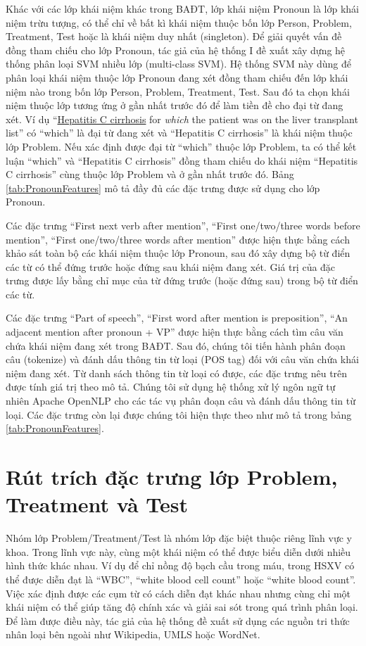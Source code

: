 Khác với các lớp khái niệm khác trong BAĐT, lớp khái niệm Pronoun là lớp khái niệm trừu tượng, có thể chỉ về bất kì khái niệm thuộc bốn lớp Person, Problem, Treatment, Test hoặc là khái niệm duy nhất (singleton). Để giải quyết vấn đề đồng tham chiếu cho lớp Pronoun, tác giả của hệ thống I đề xuất xây dựng hệ thống phân loại SVM nhiều lớp (multi-class SVM). Hệ thống SVM này dùng để phân loại khái niệm thuộc lớp Pronoun đang xét đồng tham chiếu đến lớp khái niệm nào trong bốn lớp Person, Problem, Treatment, Test. Sau đó ta chọn khái niệm thuộc lớp tương ứng ở gần nhất trước đó để làm tiền đề cho đại từ đang xét. Ví dụ ``\underline{Hepatitis C cirrhosis} for \textit{which} the patient was on the liver transplant list'' có ``which'' là đại từ đang xét và ``Hepatitis C cirrhosis'' là khái niệm thuộc lớp Problem. Nếu xác định được đại từ ``which'' thuộc lớp Problem, ta có thể kết luận ``which'' và ``Hepatitis C cirrhosis'' đồng tham chiếu do khái niệm ``Hepatitis C cirrhosis'' cùng thuộc lớp Problem và ở gần nhất trước đó. Bảng \ref{tab:PronounFeatures} mô tả đầy đủ các đặc trưng được sử dụng cho lớp Pronoun.

Các đặc trưng ``First next verb after mention'', ``First one/two/three words before mention'', ``First one/two/three words after mention'' được hiện thực bằng cách khảo sát toàn bộ các khái niệm thuộc lớp Pronoun, sau đó xây dựng bộ từ điển các từ có thể đứng trước hoặc đứng sau khái niệm đang xét. Giá trị của đặc trưng được lấy bằng chỉ mục của từ đứng trước (hoặc đứng sau) trong bộ từ điển các từ.

Các đặc trưng ``Part of speech'', ``First word after mention is preposition'', ``An adjacent mention after pronoun + VP'' được hiện thực bằng cách tìm câu văn chứa khái niệm đang xét trong BAĐT. Sau đó, chúng tôi tiến hành phân đoạn câu (tokenize) và đánh dấu thông tin từ loại (POS tag) đối với câu văn chứa khái niệm đang xét. Từ danh sách thông tin từ loại có được, các đặc trưng nêu trên được tính giá trị theo mô tả. Chúng tôi sử dụng hệ thống xử lý ngôn ngữ tự nhiên Apache OpenNLP cho các tác vụ phân đoạn câu và đánh dấu thông tin từ loại. Các đặc trưng còn lại được chúng tôi hiện thực theo như mô tả trong bảng \ref{tab:PronounFeatures}.

\section{Rút trích đặc trưng lớp Problem, Treatment và Test}
Nhóm lớp Problem/Treatment/Test là nhóm lớp đặc biệt thuộc riêng lĩnh vực y khoa. Trong lĩnh vực này, cùng một khái niệm có thể được biểu diễn dưới nhiều hình thức khác nhau. Ví dụ để chỉ nồng độ bạch cầu trong máu, trong HSXV có thể được diễn đạt là ``WBC'', ``white blood cell count'' hoặc ``white blood count''. Việc xác định được các cụm từ có cách diễn đạt khác nhau nhưng cùng chỉ một khái niệm có thể giúp tăng độ chính xác và giải sai sót trong quá trình phân loại. Để làm được điều này, tác giả của hệ thống \cite{YanXu2012} đề xuất sử dụng các nguồn tri thức nhân loại bên ngoài như Wikipedia, UMLS hoặc WordNet.

